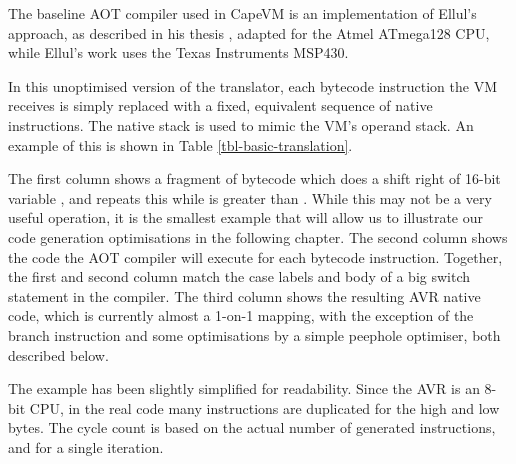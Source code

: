 The baseline AOT compiler used in CapeVM is an implementation of Ellul's approach, as described in his thesis \cite{Ellul:2012thesis}, adapted for the Atmel ATmega128 CPU, while Ellul's work uses the Texas Instruments MSP430. 

In this unoptimised version of the translator, each bytecode instruction the VM receives is simply replaced with a fixed, equivalent sequence of native instructions. The native stack is used to mimic the VM's operand stack. An example of this is shown in Table \ref{tbl-basic-translation}.

The first column shows a fragment of bytecode which does a shift right of 16-bit variable , and repeats this while  is greater than . While this may not be a very useful operation, it is the smallest example that will allow us to illustrate our code generation optimisations in the following chapter. The second column shows the code the AOT compiler will execute for each bytecode instruction. Together, the first and second column match the case labels and body of a big switch statement in the compiler. The third column shows the resulting AVR native code, which is currently almost a 1-on-1 mapping, with the exception of the branch instruction and some optimisations by a simple peephole optimiser, both described below.

The example has been slightly simplified for readability. Since the AVR is an 8-bit CPU, in the real code many instructions are duplicated for the high and low bytes. The cycle count is based on the actual number of generated instructions, and for a single iteration.


